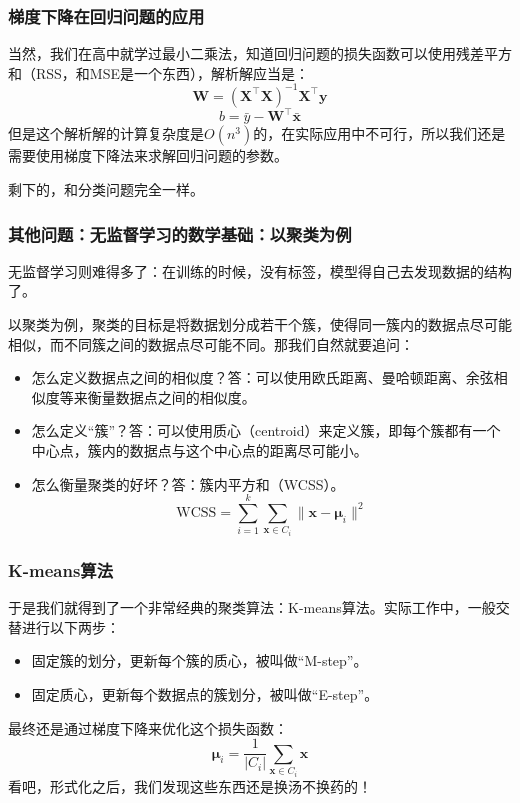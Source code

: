 \documentclass{ctexbeamer}
\begin{document}
\begin{frame}
    \frametitle{梯度下降在回归问题的应用}

    当然，我们在高中就学过最小二乘法，知道回归问题的损失函数可以使用残差平方和（RSS，和MSE是一个东西），解析解应当是：
    \[\mathbf{W} = (\mathbf{X}^\top \mathbf{X})^{-1} \mathbf{X}^\top \mathbf{y}\]
    \[b = \bar{y} - \mathbf{W}^\top \bar{\mathbf{x}}\]
    但是这个解析解的计算复杂度是$O(n^3)$的，在实际应用中不可行，所以我们还是需要使用梯度下降法来求解回归问题的参数。

    剩下的，和分类问题完全一样。

\end{frame}

\begin{frame}
    \frametitle{其他问题：无监督学习的数学基础：以聚类为例}

    无监督学习则难得多了：在训练的时候，没有标签，模型得自己去发现数据的结构了。

    以聚类为例，聚类的目标是将数据划分成若干个簇，使得同一簇内的数据点尽可能相似，而不同簇之间的数据点尽可能不同。那我们自然就要追问：
    \begin{itemize}
        \item 怎么定义数据点之间的相似度？答：可以使用欧氏距离、曼哈顿距离、余弦相似度等来衡量数据点之间的相似度。
        \item 怎么定义“簇”？答：可以使用质心（centroid）来定义簇，即每个簇都有一个中心点，簇内的数据点与这个中心点的距离尽可能小。
        \item 怎么衡量聚类的好坏？答：簇内平方和（WCSS）。
            \[\text{WCSS} = \sum_{i=1}^k \sum_{\mathbf{x} \in C_i} \|\mathbf{x} - \mathbf{\mu}_i\|^2\]
    \end{itemize}


\end{frame}

\begin{frame}
    \frametitle{K-means算法}

    于是我们就得到了一个非常经典的聚类算法：K-means算法。实际工作中，一般交替进行以下两步：
    \begin{itemize}
        \item 固定簇的划分，更新每个簇的质心，被叫做“M-step”。
        \item 固定质心，更新每个数据点的簇划分，被叫做“E-step”。
    \end{itemize}

    最终还是通过梯度下降来优化这个损失函数：
    \[\mathbf{\mu}_i = \frac{1}{|C_i|} \sum_{\mathbf{x} \in C_i} \mathbf{x}\]
    看吧，形式化之后，我们发现这些东西还是换汤不换药的！

\end{frame}
\end{document}
